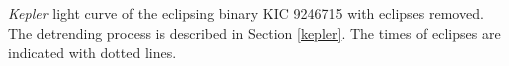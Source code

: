 \label{fig:lcfig2} \emph{Kepler} light curve of the eclipsing binary KIC 9246715 with eclipses removed. The detrending process is described in Section \ref{kepler}. The times of eclipses are indicated with dotted lines.